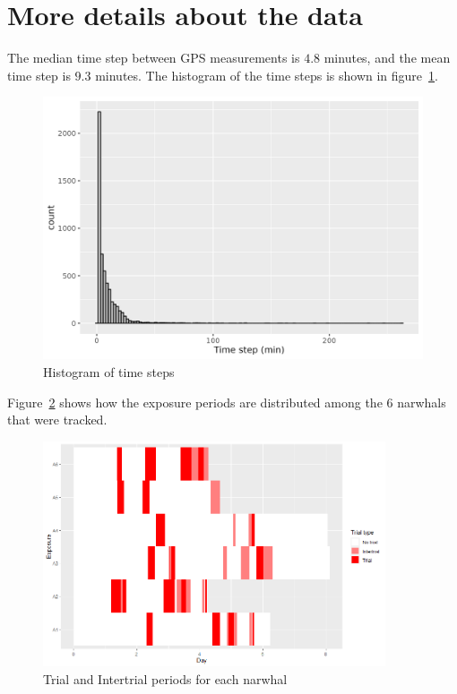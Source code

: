 \documentclass[11pt]{article}
\newcommand {\1}{\mathbb{1}}
\begin{document}
\newpage

\printbibliography

\newpage 

\appendix

\section{More details about the data}

The median time step between GPS measurements is $4.8$ minutes, and the mean time step is $9.3$ minutes. The histogram of the time steps is shown in figure~\ref{fig:alltimestepshisto}.

\begin{figure}[H]
	\centering
	\includegraphics[scale=0.5]{images/data_exploration/all_time_steps_histo}
	\caption{Histogram of time steps}
	\label{fig:alltimestepshisto}
\end{figure}

Figure~\ref{fig: trials and intertrials distributions} shows how the exposure periods are distributed among the $6$ narwhals that were tracked. 

	\begin{figure}[H]
		\centering
			\centering
			\includegraphics[width=0.9\textwidth]{images/data_exploration/trials.png}
			\caption{Trial and Intertrial periods for each narwhal}
			\label{fig: trials and intertrials distributions}
		
	\end{figure}
 
\end{document}
